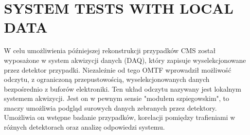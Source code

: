 \section{SYSTEM TESTS WITH LOCAL DATA}

W celu umożliwienia późniejszej rekonstrukcji przypadków CMS został wyposażone w system akwizycji danych (DAQ), który zapisuje wyselekcjonowane przez detektor przypadki. Niezależnie od tego OMTF wprowadził możliwość odczytu, z ograniczoną przepustowością, wyselekcjonowanych danych bezpośrednio z buforów elektroniki. Ten układ odczytu nazywany jest lokalnym systemem akwizycji. Jest on w pewnym sensie "modułem szpiegowskim", to znaczy umożliwia podgląd surowych danych zebranych przez detektory. Umożliwia on wstępne badanie przypadków, korelacji pomiędzy trafieniami w różnych detektorach oraz analizę odpowiedzi systemu.   
 

